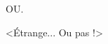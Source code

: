 \begin{tdoclatex}
\end{tdoclatex}
OU.
\begin{tdoclatex}
\string<Étrange... Ou pas !>
\end{tdoclatex}
